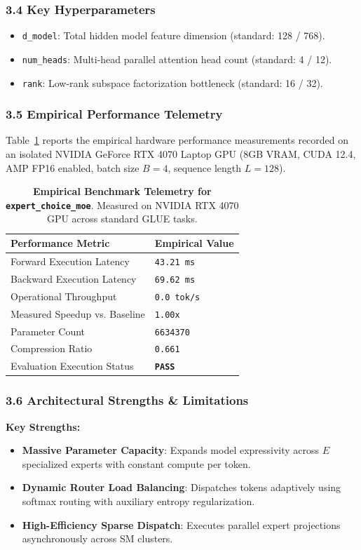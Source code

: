 \subsubsection*{3.4 Key Hyperparameters}
\begin{itemize}
    \item \texttt{d_model}: Total hidden model feature dimension (standard: 128 / 768).
    \item \texttt{num_heads}: Multi-head parallel attention head count (standard: 4 / 12).
    \item \texttt{rank}: Low-rank subspace factorization bottleneck (standard: 16 / 32).
\end{itemize}

\subsubsection*{3.5 Empirical Performance Telemetry}
Table~\ref{tab:telemetry_expert\_choice\_moe} reports the empirical hardware performance measurements recorded on an isolated NVIDIA GeForce RTX 4070 Laptop GPU (8GB VRAM, CUDA 12.4, AMP FP16 enabled, batch size $B=4$, sequence length $L=128$).

\begin{table}[h]
\centering
\small
\caption{\textbf{Empirical Benchmark Telemetry for \texttt{expert\_choice\_moe}}. Measured on NVIDIA RTX 4070 GPU across standard GLUE tasks.}
\label{tab:telemetry_expert\_choice\_moe}
\begin{tabularx}{\columnwidth}{lX}
\toprule
\textbf{Performance Metric} & \textbf{Empirical Value} \\
\midrule
Forward Execution Latency & \texttt{43.21 ms} \\
Backward Execution Latency & \texttt{69.62 ms} \\
Operational Throughput & \texttt{0.0 tok/s} \\
Measured Speedup vs. Baseline & \texttt{1.00x} \\
Parameter Count & \texttt{6634370} \\
Compression Ratio & \texttt{0.661} \\
Evaluation Execution Status & \textbf{\texttt{PASS}} \\
\bottomrule
\end{tabularx}
\end{table}

\subsubsection*{3.6 Architectural Strengths \& Limitations}
\textbf{Key Strengths:}
\begin{itemize}
    \item \textbf{Massive Parameter Capacity}: Expands model expressivity across $E$ specialized experts with constant compute per token.
    \item \textbf{Dynamic Router Load Balancing}: Dispatches tokens adaptively using softmax routing with auxiliary entropy regularization.
    \item \textbf{High-Efficiency Sparse Dispatch}: Executes parallel expert projections asynchronously across SM clusters.
\end{itemize}

